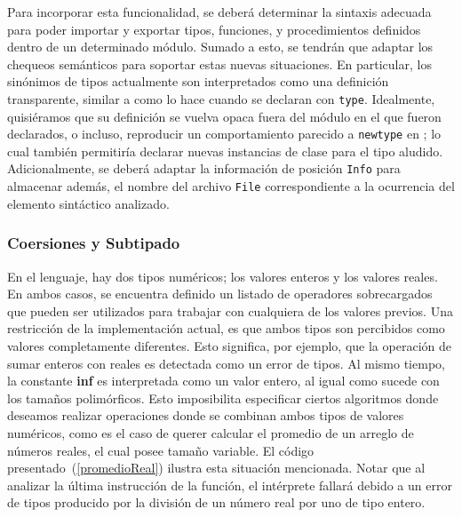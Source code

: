 Para incorporar esta funcionalidad, se deberá determinar la sintaxis adecuada para poder importar y exportar tipos, funciones, y procedimientos definidos dentro de un determinado módulo.
Sumado a esto, se tendrán que adaptar los chequeos semánticos para soportar estas nuevas situaciones.
En particular, los sinónimos de tipos actualmente son interpretados como una definición transparente, similar a como lo hace \Haskell{} cuando se declaran con \lstinline[style = haskell]{type}.
Idealmente, quisiéramos que su definición se vuelva opaca fuera del módulo en el que fueron declarados, o incluso, reproducir un comportamiento parecido a \lstinline[style = haskell]{newtype} en \Haskell{}; lo cual también permitiría declarar nuevas instancias de clase para el tipo aludido.
Adicionalmente, se deberá adaptar la información de posición \lstinline[style = haskell]{Info} para almacenar además, el nombre del archivo \lstinline[style = haskell]{File} correspondiente a la ocurrencia del elemento sintáctico analizado.

\subsubsection{Coersiones y Subtipado}

En el lenguaje, hay dos tipos numéricos; los valores enteros y los valores reales.
En ambos casos, se encuentra definido un listado de operadores sobrecargados que pueden ser utilizados para trabajar con cualquiera de los valores previos.
Una restricción de la implementación actual, es que ambos tipos son percibidos como valores completamente diferentes.
Esto significa, por ejemplo, que la operación de sumar enteros con reales es detectada como un error de tipos.
Al mismo tiempo, la constante \textbf{inf} es interpretada como un valor entero, al igual como sucede con los tamaños polimórficos.
Esto imposibilita especificar ciertos algoritmos donde deseamos realizar operaciones donde se combinan ambos tipos de valores numéricos, como es el caso de querer calcular el promedio de un arreglo de números reales, el cual posee tamaño variable.
El código presentado~(\ref{promedioReal}) ilustra esta situación mencionada.
Notar que al analizar la última instrucción de la función, el intérprete fallará debido a un error de tipos producido por la división de un número real por uno de tipo entero.

